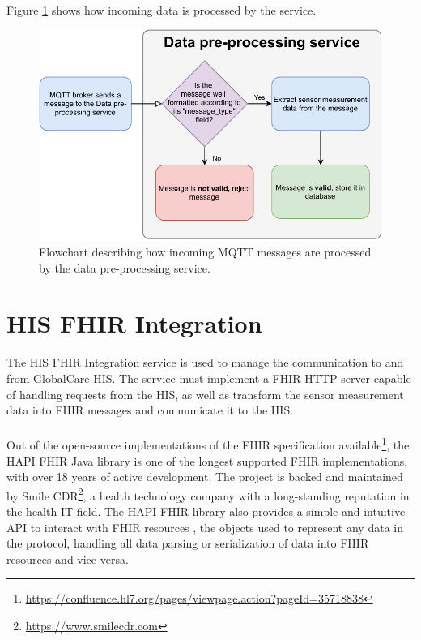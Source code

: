\paragraph{} Figure \ref{fig:dataprocess_flowdiagram} shows how incoming data is processed by the service. 

\begin{figure}[H]
    \centering
    \includegraphics[width=0.7\linewidth]{images/data pre processing.pdf}
    \caption[Flowchart describing how incoming \acs{MQTT} messages are processed by the data pre-processing service.]{Flowchart describing how incoming \acs{MQTT} messages are processed by the data pre-processing service.}
    \label{fig:dataprocess_flowdiagram}
\end{figure}

\section{\acs{HIS} \acs{FHIR} Integration}
The \acs{HIS} \acs{FHIR} Integration service is used to manage the communication to and from GlobalCare \acs{HIS}. The service must implement a \acs{FHIR} \acs{HTTP} server \cite{fhir} capable of handling requests from the \acs{HIS}, as well as transform the sensor measurement data into \acs{FHIR} messages and communicate it to the \acs{HIS}.

\paragraph{} Out of the open-source implementations of the \acs{FHIR} specification available\footnote{\url{https://confluence.hl7.org/pages/viewpage.action?pageId=35718838}}, the HAPI FHIR Java library \cite{hapifhir} is one of the longest supported \acs{FHIR} implementations, with over 18 years of active development. The project is backed and maintained by Smile CDR\footnote{\url{https://www.smilecdr.com}}, a health technology company with a long-standing reputation in the health \acs{IT} field. The HAPI FHIR library also provides a simple and intuitive \acs{API} to interact with \acs{FHIR} resources \cite{fhir}, the objects used to represent any data in the protocol, handling all data parsing or serialization of data into \acs{FHIR} resources and vice versa.

